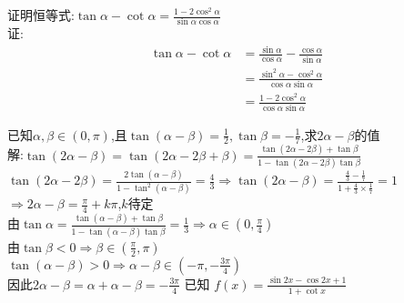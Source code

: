 \documentclass[12pt,answers]{exam}
\begin{document}
\begin{questions}
\question 
证明恒等式:$\displaystyle \tan\alpha-\cot\alpha=\frac{1-2\cos^2\alpha}{\sin\alpha\cos\alpha}$\\
证: 
\begin{equation*}
\begin{split}
\tan\alpha -\cot\alpha &= \frac{\sin\alpha}{\cos\alpha} -\frac{\cos\alpha}{\sin\alpha} \\
                       &= \frac{\sin^2\alpha-\cos^2\alpha}{\cos\alpha\sin\alpha}\\
                       & = \frac{1-2\cos^2\alpha}{\cos\alpha\sin\alpha}
\end{split}
\end{equation*}

\question
已知$\alpha,\beta \in (0,\pi)$,且$\displaystyle \tan(\alpha-\beta)=\frac{1}{2},\tan\beta=-\frac{1}{7}$,求$2\alpha-\beta$的值\\
解:$\displaystyle \tan{(2\alpha-\beta)} =\tan(2\alpha-2\beta +\beta)=\frac{\tan(2\alpha-2\beta)+\tan\beta}{1-\tan(2\alpha-2\beta)\tan\beta}$  \\
$\displaystyle \tan{(2\alpha-2\beta)} =\frac{2\tan(\alpha-\beta)}{1-\tan^2(\alpha-\beta)}=\frac{4}{3}\Rightarrow \tan(2\alpha-\beta)= \frac{\frac{4}{3}-\frac{1}{7}}{1+\frac{4}{3}\times\frac{1}{7}}=1$\\
$\displaystyle \Rightarrow 2\alpha-\beta =\frac{\pi}{4}+k\pi$,$k$待定 \\
由$\displaystyle \tan\alpha =\frac{\tan(\alpha-\beta)+\tan\beta}{1-\tan(\alpha-\beta)\tan\beta}=\frac{1}{3}\Rightarrow \alpha \in (0,\frac{\pi}{4})$\\
由$\displaystyle \tan\beta<0\Rightarrow \beta \in (\frac{\pi}{2},\pi)$\\
$\displaystyle \tan(\alpha-\beta)>0 \Rightarrow \alpha-\beta\in (-\pi,-\frac{3\pi}{4})$ \\
因此$\displaystyle 2\alpha-\beta =\alpha +\alpha -\beta =-\frac{3\pi}{4}$
\question 
已知 $\displaystyle f(x)=\frac{\sin{2x}-\cos{2x}+1}{1+\cot{x}}$
\begin{parts}

\end{parts}
\end{questions}
\end{document}
